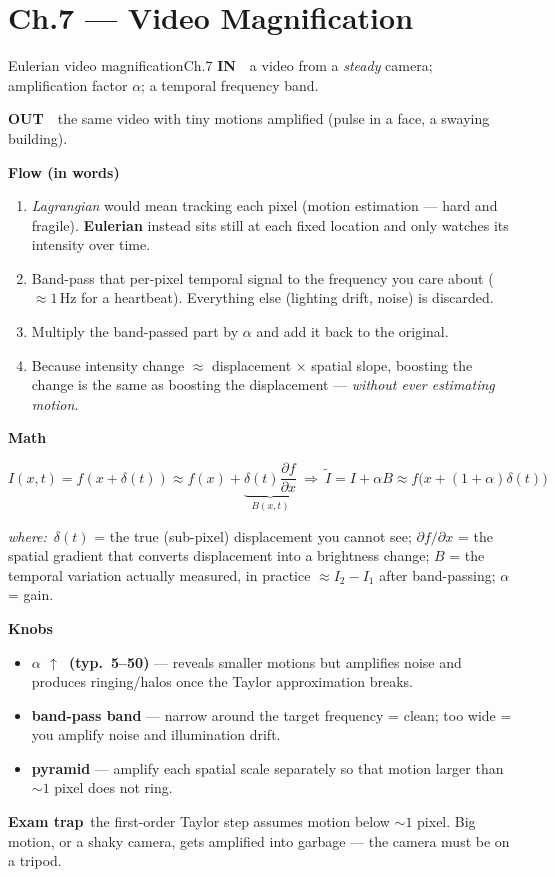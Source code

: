 \documentclass[9pt,a4paper]{extarticle}
\newcommand{\IN}{\textbf{\color{cIn}IN}\ }
\newcommand{\OUT}{\par\textbf{\color{cOut}OUT}\ }
\newcommand{\FLOW}{\par\smallskip\textbf{Flow (in words)}\par\nopagebreak}
\newcommand{\MATH}{\par\smallskip\textbf{Math}\par\nopagebreak}
\newcommand{\KNOBS}{\par\smallskip\textbf{Knobs}\par\nopagebreak}
\newcommand{\TRAP}{\par\smallskip\textbf{\color{cTrap}Exam trap}\ }
\newcommand{\WHERE}{\par\textit{where:}\ }
\newcommand{\up}{$\uparrow$}
\newcommand{\kn}[2]{\item \textbf{#1} --- #2}
\begin{document}
\section{Ch.7 --- Video Magnification}

\begin{card}{Eulerian video magnification}{Ch.7}
\IN\ a video from a \emph{steady} camera; amplification factor $\alpha$; a temporal frequency band.
\OUT\ the same video with tiny motions amplified (pulse in a face, a swaying building).

\FLOW
\begin{enumerate}
  \item \emph{Lagrangian} would mean tracking each pixel (motion estimation --- hard and fragile). \textbf{Eulerian} instead sits still at each fixed location and only watches its intensity over time.
  \item Band-pass that per-pixel temporal signal to the frequency you care about ($\approx1$\,Hz for a heartbeat). Everything else (lighting drift, noise) is discarded.
  \item Multiply the band-passed part by $\alpha$ and add it back to the original.
  \item Because intensity change $\approx$ displacement $\times$ spatial slope, boosting the change is the same as boosting the displacement --- \emph{without ever estimating motion}.
\end{enumerate}

\MATH
\[ I(x,t)=f(x+\delta(t))\approx f(x)+\underbrace{\delta(t)\frac{\partial f}{\partial x}}_{B(x,t)}\ \Rightarrow\ \tilde I=I+\alpha B\approx f\big(x+(1+\alpha)\delta(t)\big) \]
\WHERE $\delta(t)$ = the true (sub-pixel) displacement you cannot see; $\partial f/\partial x$ = the spatial gradient that converts displacement into a brightness change; $B$ = the temporal variation actually measured, in practice $\approx I_2-I_1$ after band-passing; $\alpha$ = gain.

\KNOBS
\begin{itemize}
  \kn{$\alpha$ \up\ (typ.\ 5--50)}{reveals smaller motions but amplifies noise and produces ringing/halos once the Taylor approximation breaks.}
  \kn{band-pass band}{narrow around the target frequency = clean; too wide = you amplify noise and illumination drift.}
  \kn{pyramid}{amplify each spatial scale separately so that motion larger than $\sim1$ pixel does not ring.}
\end{itemize}
\TRAP the first-order Taylor step assumes motion below $\sim1$ pixel. Big motion, or a shaky camera, gets amplified into garbage --- the camera must be on a tripod.
\end{card}
\end{document}
